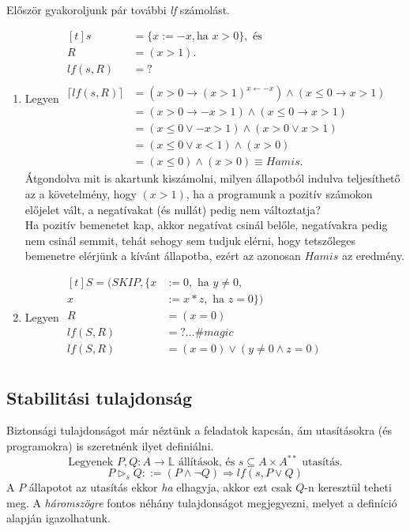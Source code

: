 \documentclass[12pt]{article}
\begin{document}
\paragraph{}Először gyakoroljunk pár további \textit{lf} számolást.\\
\begin{enumerate}
	\item  Legyen $\begin{aligned}[t]
			s &= \{x := -x, \text{ha } x>0\}, \text{ és}\\
			R &= (x>1).\\
			lf(s,R) &= ? \\
			 \\
			\lceil lf(s,R) \rceil &= (x>0 \rightarrow (x>1)^{x \leftarrow -x}) \land (x \le 0 \rightarrow x > 1) \\
			&= (x>0 \rightarrow -x>1 ) \land (x \le 0 \rightarrow x > 1) \\
			&= (x \le 0 \lor -x > 1) \land (x > 0 \lor x > 1) \\
			&= (x \le 0 \lor x < 1) \land (x>0) \\
			&= (x \le 0) \land (x>0) \equiv Hamis.
			\end{aligned}$\\
		Átgondolva mit is akartunk kiszámolni, milyen állapotból indulva teljesíthető az a követelmény, hogy $(x>1)$, ha a programunk a pozitív számokon előjelet vált, a negatívakat (és nullát) pedig nem változtatja?\\
		Ha pozitív bemenetet kap, akkor negatívat csinál belőle, negatívakra pedig nem csinál semmit, tehát sehogy sem tudjuk elérni, hogy tetszőleges bemenetre elérjünk a kívánt állapotba, ezért az azonosan $Hamis$ az eredmény.
	\item Legyen $\begin{aligned}[t]
	S = (SKIP, \{x&:=0, \text{ ha } y \ne 0, \\
				x&:=x*z, \text{ ha } z = 0\})\\
				R &= (x=0)\\
	lf(S,R) &= ? \dots \#magic\\
	lf(S,R) &= (x=0) \lor (y \ne 0 \land z=0)\\
	\end{aligned}$\\
\end{enumerate}

\subsection{Stabilitási tulajdonság}
Biztonsági tulajdonságot már néztünk a feladatok kapcsán, ám utasításokra (és programokra) is szeretnénk ilyet definiálni.
$$\text{Legyenek }P,Q: A \rightarrow \mathbb{L} \text{ állítások, és } s \subseteq A \times A^{**} \text{ utasítás.}$$
$$P \vartriangleright_s Q ::= (P \land \neg Q) \Rightarrow lf(s, P \lor Q)$$
A $P$ állapotot az utasítás ekkor \textit{ha} elhagyja, akkor ezt csak $Q$-n keresztül teheti meg.
A \textit{háromszögre} fontos néhány tulajdonságot megjegyezni, melyet a definíció alapján igazolhatunk.
\end{document}
